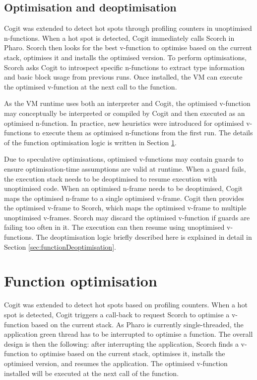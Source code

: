 \documentclass[a4paper,12pt,twoside]{../includes/ThesisStyle}
\begin{document}
\subsection{Optimisation and deoptimisation}
\label{sec:further}

Cogit was extended to detect hot spots through profiling counters in unoptimised n-functions. When a hot spot is detected, Cogit immediately calls Scorch in Pharo. Scorch then looks for the best v-function to optimise based on the current stack, optimises it and installs the optimised version. To perform optimisations, Scorch asks Cogit to introspect specific n-functions to extract type information and basic block usage from previous runs. Once installed, the VM can execute the optimised v-function at the next call to the function. 

As the VM runtime uses both an interpreter and Cogit, the optimised v-function may conceptually be interpreted or compiled by Cogit and then executed as an optimised n-function. In practice, new heuristics were introduced for optimised v-functions to execute them as optimised n-functions from the first run. The details of the function optimisation logic is written in Section \ref{sec:functionOptimisation}.

Due to speculative optimisations, optimised v-functions may contain guards to ensure optimisation-time assumptions are valid at runtime. When a guard fails, the execution stack needs to be deoptimised to resume execution with unoptimised code. When an optimised n-frame needs to be deoptimised, Cogit maps the optimised n-frame to a single optimised v-frame. Cogit then provides the optimised v-frame to Scorch, which maps the optimised v-frame to multiple unoptimised v-frames. Scorch may discard the optimised v-function if guards are failing too often in it. The execution can then resume using unoptimised v-functions. The deoptimisation logic briefly described here is explained in detail in Section \ref{sec:functionDeoptimisation}.


\section{Function optimisation}
\label{sec:functionOptimisation}

Cogit was extended to detect hot spots based on profiling counters. When a hot spot is detected, Cogit triggers a call-back to request Scorch to optimise a v-function based on the current stack. As Pharo is currently single-threaded, the application green thread has to be interrupted to optimise a function. The overall design is then the following: after interrupting the application, Scorch finds a v-function to optimise based on the current stack, optimises it, installs the optimised version, and resumes the application. The optimised v-function installed will be executed at the next call of the function.
\end{document}
